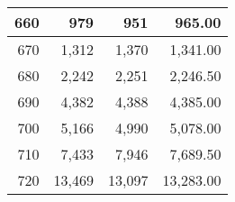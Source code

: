 \begin{longtable}{|r|r|r|r|}
		660                                                                                                                   & 979                                                  & 951                                                  & 965.00                                                                                                                 \\ \hline
		670                                                                                                                   & 1,312                                                & 1,370                                                & 1,341.00                                                                                                               \\ \hline
		680                                                                                                                   & 2,242                                                & 2,251                                                & 2,246.50                                                                                                               \\ \hline
		690                                                                                                                   & 4,382                                                & 4,388                                                & 4,385.00                                                                                                               \\ \hline
		700                                                                                                                   & 5,166                                                & 4,990                                                & 5,078.00                                                                                                               \\ \hline
		710                                                                                                                   & 7,433                                                & 7,946                                                & 7,689.50                                                                                                               \\ \hline
		720                                                                                                                   & 13,469                                               & 13,097                                               & 13,283.00                                                                                                              \\ \hline

\end{longtable}
